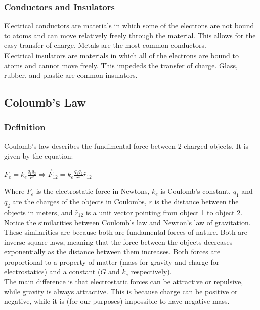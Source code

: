 \newpage

\subsubsection*{Conductors and Insulators}
\hspace{.5cm} 
Electrical conductors are materials in which some of the electrons are not bound to atoms and can move relatively freely
through the material. This allows for the easy transfer of charge. Metals are the most common conductors.\\

Electrical insulators are materials in which all of the electrons are bound to atoms and cannot move freely. This impededs
the transfer of charge. Glass, rubber, and plastic are common insulators.\\

\hrulefill


\begin{center}
    \subsection*{Coloumb's Law}
\end{center}


\subsubsection*{Definition}
\hspace{.5cm}
Coulomb's law describes the fundimental force between 2 charged objects. It is given by the equation:

\begin{center}
    $F_e = k_e \frac{q_1q_2}{r^2} \Longrightarrow \vec{F}_{12} = k_e \frac{q_1q_2}{r^2}\hat{r}_{12}$
\end{center}

\hspace{.5cm}
Where $F_e$ is the electrostatic force in Newtons, $k_e$ is Coulomb's constant, $q_1$ and $q_2$ are the charges of the objects in Coulombs,
$r$ is the distance between the objects in meters, and $\hat{r}_{12}$ is a unit vector pointing from object 1 to object 2.\\

Notice the similarities between Coulomb's law and Newton's law of gravitation. These similarities are because both are fundamental forces of nature.
Both are inverse square laws, meaning that the force between the objects decreases exponentially as the distance between them increases. Both forces are
proportional to a property of matter (mass for gravity and charge for electrostatics) and a constant ($G$ and $k_e$ respectively).\\

The main difference is that electrostatic forces can be attractive or repulsive, while gravity is always attractive. This is because charge can be positive
or negative, while it is (for our purposes) impossible to have negative mass.\\

